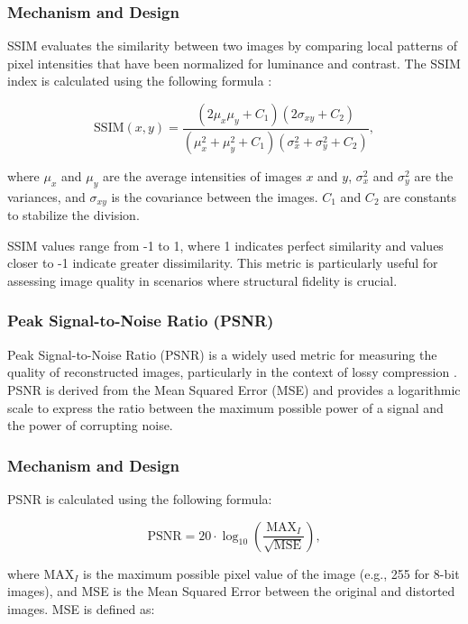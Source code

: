 \documentclass[a4paper,12pt]{article}
\begin{document}
\subsubsection{Mechanism and Design}

SSIM evaluates the similarity between two images by comparing local patterns of pixel intensities that have been normalized for luminance and contrast. The SSIM index is calculated using the following formula \cite{zhou_wang_image_2004}:

$$
\text{SSIM}(x, y) = \frac{(2\mu_x\mu_y + C_1)(2\sigma_{xy} + C_2)}{(\mu_x^2 + \mu_y^2 + C_1)(\sigma_x^2 + \sigma_y^2 + C_2)},
$$

where \( \mu_x \) and \( \mu_y \) are the average intensities of images \( x \) and \( y \), \( \sigma_x^2 \) and \( \sigma_y^2 \) are the variances, and \( \sigma_{xy} \) is the covariance between the images. \( C_1 \) and \( C_2 \) are constants to stabilize the division.

SSIM values range from -1 to 1, where 1 indicates perfect similarity and values closer to -1 indicate greater dissimilarity. This metric is particularly useful for assessing image quality in scenarios where structural fidelity is crucial.

\subsubsection{Peak Signal-to-Noise Ratio (PSNR)}

Peak Signal-to-Noise Ratio (PSNR) is a widely used metric for measuring the quality of reconstructed images, particularly in the context of lossy compression \cite{zhou_wang_image_2004}. PSNR is derived from the Mean Squared Error (MSE) and provides a logarithmic scale to express the ratio between the maximum possible power of a signal and the power of corrupting noise.

\subsubsection{Mechanism and Design}

PSNR is calculated using the following formula:

$$
\text{PSNR} = 20 \cdot \log_{10} \left(\frac{\text{MAX}_I}{\sqrt{\text{MSE}}}\right),
$$

where \( \text{MAX}_I \) is the maximum possible pixel value of the image (e.g., 255 for 8-bit images), and MSE is the Mean Squared Error between the original and distorted images. MSE is defined as:
\end{document}
